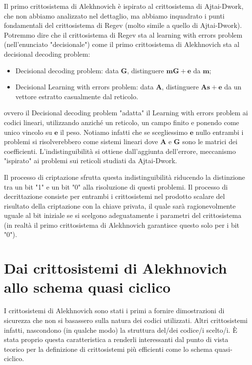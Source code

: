 \documentclass[12pt, a4paper]{report}
\theoremstyle{definition}
\begin{document}
		Il primo crittosistema di Alekhnovich è ispirato al crittosistema di Ajtai-Dwork, che non abbiamo analizzato nel dettaglio, ma abbiamo inquadrato i punti fondamentali del crittosistema di Regev (molto simile a quello di Ajtai-Dwork). Potremmo dire che il crittosistema di Regev sta al learning with errors problem (nell'enunciato "decisionale") come il primo crittosistema di Alekhnovich sta al decisional decoding problem:
		\begin{itemize}
			\item Decisional decoding problem: data $\mathbf{G}$, distinguere $\textbf{m}\mathbf{G}+\textbf{e}$ da $\textbf{m}$;
			\item Decisional Learning with errors problem: data $\mathbf{A}$, distinguere $\mathbf{A}\textbf{s}+\textbf{e}$ da un vettore estratto casualmente dal reticolo.
		\end{itemize}
		ovvero il Decisional decoding problem "adatta" il Learning with errors problem ai codici lineari, utilizzando anziché un reticolo, un campo finito e ponendo come unico vincolo su $\textbf{e}$ il peso. Notiamo infatti che se scegliessimo $\textbf{e}$ nullo entrambi i problemi si risolverebbero come sistemi lineari dove $\mathbf{A}$ e $\mathbf{G}$ sono le matrici dei coefficienti. L'indistinguibilità si ottiene dall'aggiunta dell'errore, meccanismo "ispirato" ai problemi sui reticoli studiati da Ajtai-Dwork.
		
		Il processo di criptazione sfrutta questa indistinguibilità riducendo la distinzione tra un bit "1" e un bit "0" alla risoluzione di questi problemi. Il processo di decrittazione consiste per entrambi i crittosistemi nel prodotto scalare del risultato della criptazione con la chiave privata, il quale sarà ragionevolmente uguale al bit iniziale se si scelgono adeguatamente i parametri del crittosistema (in realtà il primo crittosistema di Alekhnovich garantisce questo solo per i bit "0").
		
		\section{Dai crittosistemi di Alekhnovich allo schema quasi ciclico \cite{15} \cite{13}}
			I crittosistemi di Alekhnovich sono stati i primi a fornire dimostrazioni di sicurezza che non si basassero sulla natura dei codici utilizzati. Altri crittosistemi infatti, nascondono (in qualche modo) la struttura del/dei codice/i scelto/i. È stata proprio questa caratteristica a renderli interessanti dal punto di vista teorico per la definizione di crittosistemi più efficienti come lo schema quasi-ciclico.
			
\end{document}
